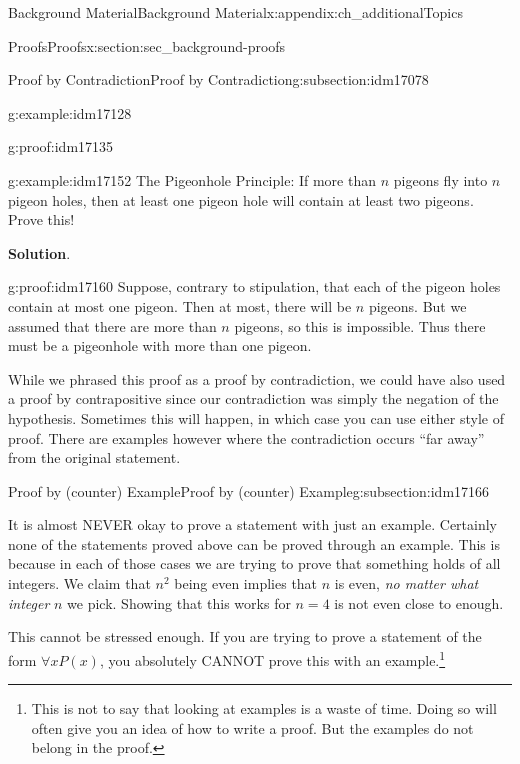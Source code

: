 \documentclass[oneside,10pt,]{book}
\numberwithin{equation}{chapter}
\begin{document}
\begin{appendixptx}{Background Material}{}{Background Material}{}{}{x:appendix:ch_additionalTopics}
\begin{sectionptx}{Proofs}{}{Proofs}{}{}{x:section:sec_background-proofs}
\begin{subsectionptx}{Proof by Contradiction}{}{Proof by Contradiction}{}{}{g:subsection:idm17078}
\begin{example}{}{g:example:idm17128}
\begin{proofptx}{}{g:proof:idm17135}
\end{proofptx}
\end{example}
\begin{example}{}{g:example:idm17152}%
The Pigeonhole Principle: If more than \(n\) pigeons fly into \(n\) pigeon holes, then at least one pigeon hole will contain at least two pigeons. Prove this!%
\par\smallskip%
\noindent\textbf{Solution}.\hypertarget{g:solution:idm17159}{}\quad{}\begin{proofptx}{}{g:proof:idm17160}
Suppose, contrary to stipulation, that each of the pigeon holes contain at most one pigeon. Then at most, there will be \(n\) pigeons. But we assumed that there are more than \(n\) pigeons, so this is impossible. Thus there must be a pigeonhole with more than one pigeon.%
\end{proofptx}
While we phrased this proof as a proof by contradiction, we could have also used a proof by contrapositive since our contradiction was simply the negation of the hypothesis. Sometimes this will happen, in which case you can use either style of proof. There are examples however where the contradiction occurs ``far away'' from the original statement.%
\end{example}
\end{subsectionptx}
%
%
\typeout{************************************************}
\typeout{************************************************}
%
\begin{subsectionptx}{Proof by (counter) Example}{}{Proof by (counter) Example}{}{}{g:subsection:idm17166}
%
\par
It is almost NEVER okay to prove a statement with just an example. Certainly none of the statements proved above can be proved through an example. This is because in each of those cases we are trying to prove that something holds of all integers. We claim that \(n^2\) being even implies that \(n\) is even, \emph{no matter what integer} \(n\) we pick. Showing that this works for \(n = 4\) is not even close to enough.%
\par
This cannot be stressed enough. If you are trying to prove a statement of the form \(\forall x P(x)\), you absolutely CANNOT prove this with an example.\footnote{This is not to say that looking at examples is a waste of time. Doing so will often give you an idea of how to write a proof. But the examples do not belong in the proof.\label{g:fn:idm17180}}%
\par

\end{subsectionptx}
\end{sectionptx}
\end{appendixptx}
\end{document}
